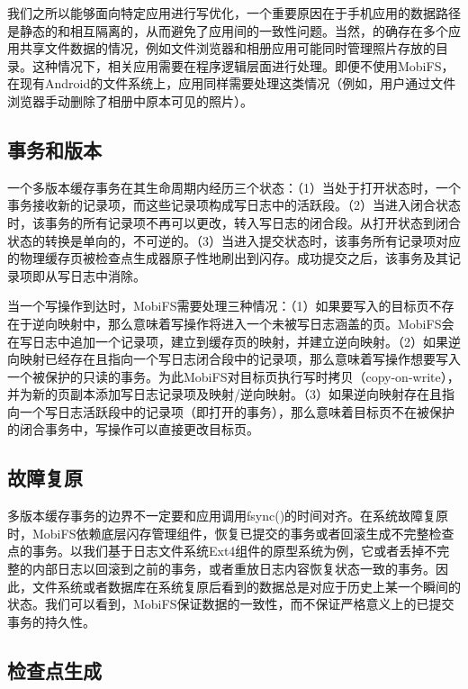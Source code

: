 我们之所以能够面向特定应用进行写优化，一个重要原因在于手机应用的数据路径是静态的和相互隔离的，从而避免了应用间的一致性问题。当然，的确存在多个应用共享文件数据的情况，例如文件浏览器和相册应用可能同时管理照片存放的目录。这种情况下，相关应用需要在程序逻辑层面进行处理。即便不使用MobiFS，在现有Android的文件系统上，应用同样需要处理这类情况（例如，用户通过文件浏览器手动删除了相册中原本可见的照片）。 

\subsection{事务和版本}

一个多版本缓存事务在其生命周期内经历三个状态：（1）当处于打开状态时，一个事务接收新的记录项，而这些记录项构成写日志中的活跃段。（2）当进入闭合状态时，该事务的所有记录项不再可以更改，转入写日志的闭合段。从打开状态到闭合状态的转换是单向的，不可逆的。（3）当进入提交状态时，该事务所有记录项对应的物理缓存页被检查点生成器原子性地刷出到闪存。成功提交之后，该事务及其记录项即从写日志中消除。 
 
当一个写操作到达时，MobiFS需要处理三种情况：（1）如果要写入的目标页不存在于逆向映射中，那么意味着写操作将进入一个未被写日志涵盖的页。MobiFS会在写日志中追加一个记录项，建立到缓存页的映射，并建立逆向映射。（2）如果逆向映射已经存在且指向一个写日志闭合段中的记录项，那么意味着写操作想要写入一个被保护的只读的事务。为此MobiFS对目标页执行写时拷贝（copy-on-write），并为新的页副本添加写日志记录项及映射/逆向映射。（3）如果逆向映射存在且指向一个写日志活跃段中的记录项（即打开的事务），那么意味着目标页不在被保护的闭合事务中，写操作可以直接更改目标页。

\subsection{故障复原}

多版本缓存事务的边界不一定要和应用调用fsync()的时间对齐。在系统故障复原时，MobiFS依赖底层闪存管理组件，恢复已提交的事务或者回滚生成不完整检查点的事务。以我们基于日志文件系统Ext4组件的原型系统为例，它或者丢掉不完整的内部日志以回滚到之前的事务，或者重放日志内容恢复状态一致的事务。因此，文件系统或者数据库在系统复原后看到的数据总是对应于历史上某一个瞬间的状态。我们可以看到，MobiFS保证数据的一致性，而不保证严格意义上的已提交事务的持久性。

\subsection{检查点生成}

